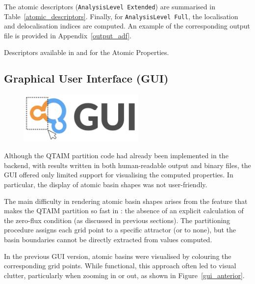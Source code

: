 \newpage
The atomic descriptors (\texttt{AnalysisLevel Extended}) are summarised in
Table~\ref{atomic_descriptors}. Finally, for \texttt{AnalysisLevel Full}, the
localisation and delocalisation indices are computed. An example of the
corresponding output file is provided in Appendix~\ref{output_adf}.

\begin{table}[h!]
  \caption{Descriptors available in \adf and for the Atomic Properties.}
  
  \label{atomic_descriptors}
\end{table}

\newpage
\subsection{Graphical User Interface (\gls{GUI})}

\begin{figure}
\centering
  \includegraphics[width=0.55\textwidth]{img/gui}
  \label{gui}
\end{figure}

Although the \gls{QTAIM} partition code had already been implemented in the
\fortran backend, with results written in both human-readable output and binary
files, the \gls{GUI} offered only limited support for visualising the computed
properties. In particular, the display of atomic basin shapes was not
user-friendly.

The main difficulty in rendering atomic basin shapes arises from the
feature that makes the \gls{QTAIM} partition so fast in \ams: the absence of an
explicit calculation of the zero-flux condition (as discussed in previous
sections). The partitioning procedure assigns each grid point to a specific
attractor (or to none), but the basin boundaries cannot be directly extracted
from values computed.

In the previous \gls{GUI} version, atomic basins were visualised by colouring
the corresponding grid points. While functional, this approach often led to
visual clutter, particularly when zooming in or out, as shown in
Figure~\ref{gui_anterior}.

